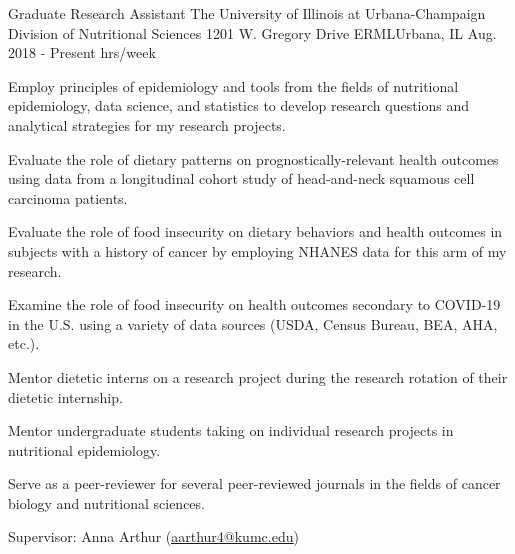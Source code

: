 \begin{cventries}
  \cventry
    {Graduate Research Assistant} %
    {The University of Illinois at Urbana-Champaign \newline Division of Nutritional Sciences } %
    {1201 W. Gregory Drive  ERML\newline Urbana, IL} %
    {Aug. 2018 - Present  hrs/week} %
    {
      \begin{cvitems} %
              \item {Employ principles of epidemiology and tools from the fields of nutritional epidemiology, data science, and statistics to develop research questions and analytical strategies for my research projects.}
        \item {Evaluate the role of dietary patterns on prognostically-relevant health outcomes using data from a longitudinal cohort study of head-and-neck squamous cell carcinoma patients.}
        \item {Evaluate the role of food insecurity on dietary behaviors and health outcomes in subjects with a history of cancer by employing NHANES data for this arm of my research.}
        \item {Examine the role of food insecurity on health outcomes secondary to COVID-19 in the U.S. using a variety of data sources (USDA, Census Bureau, BEA, AHA, etc.).}
        \item{Mentor dietetic interns on a research project during the research rotation of their dietetic internship.}
        \item{Mentor undergraduate students taking on individual research projects in nutritional epidemiology.}
        \item{Serve as a peer-reviewer for several peer-reviewed journals in the fields of cancer biology and nutritional sciences.}
        \item {Supervisor: Anna Arthur (\textcolor{navyblue}{\underline{\href{mailto:aarthur4@kumc.edu}{aarthur4@kumc.edu}}})}
      \end{cvitems}
    }



\end{cventries}
